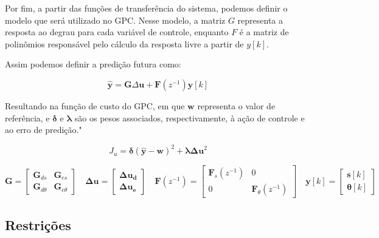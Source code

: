 Por fim, a partir das funções de transferência do sistema,
podemos definir o modelo que será utilizado no GPC.
Nesse modelo, a matriz $G$ representa a resposta ao degrau para cada variável de controle,
enquanto $F$ é a matriz de polinômios responsável pelo cálculo da
resposta livre a partir de $y[k]$.

Assim podemos definir a predição futura como: 

\begin{equation}
\hat{\mathbf{y}} = \mathbf{G} \Delta \mathbf{u} + \mathbf{F}(z^{-1}) \mathbf{y}[k]
\end{equation}

Resultando na função de custo do GPC, em que $\mathbf{w}$ representa o valor de 
referência, e $\boldsymbol{\delta}$ e $\boldsymbol{\lambda}$ são os pesos associados, 
respectivamente, à ação de controle e ao erro de predição."

\begin{equation}
J_u = \boldsymbol{\delta} (\hat{\mathbf{y}} - \mathbf{w})^2 + \boldsymbol{\lambda} \mathbf{\Delta u}^2
\end{equation}

\[
\mathbf{G} = 
\begin{bmatrix}
\mathbf{G}_{d s} & \mathbf{G}_{e s}\\
\mathbf{G}_{d \theta}  & \mathbf{G}_{e \theta}
\end{bmatrix}
\quad
\mathbf{\Delta u} =
\begin{bmatrix}
\mathbf{\Delta u_d} \\
\mathbf{\Delta u_e}
\end{bmatrix}
\quad
\mathbf{F}(z^{-1}) =
\begin{bmatrix}
\mathbf{F}_{s}(z^{-1}) & 0\\
0 & \mathbf{F}_{\theta}(z^{-1})
\end{bmatrix}
\quad
\mathbf{y}[k] =
\begin{bmatrix}
\mathbf{s}[k] \\
\mathbf{\theta}[k]
\end{bmatrix}
\]

\subsection{Restrições}